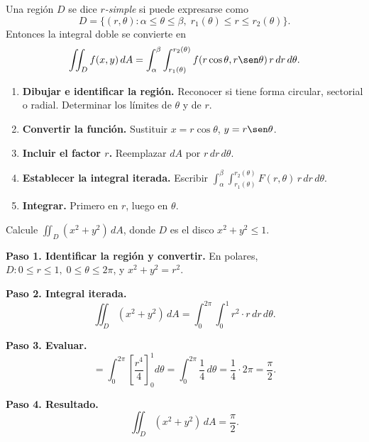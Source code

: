 Una región \(D\) se dice \emph{\(r\)-simple} si puede expresarse como
\[
D = \{(r,\theta): \alpha\le \theta\le \beta,\; r_1(\theta)\le r\le r_2(\theta)\}.
\]
Entonces la integral doble se convierte en
\[
\iint_D f(x,y)\,dA = \int_{\alpha}^{\beta}\int_{r_1(\theta)}^{r_2(\theta)} f(r\cos\theta,r\sen\theta)\,r\,dr\,d\theta.
\]

\begin{pasos}
\begin{enumerate}
    \item \textbf{Dibujar e identificar la región.} Reconocer si tiene forma circular, sectorial o radial. Determinar los límites de \(\theta\) y de \(r\).
    \item \textbf{Convertir la función.} Sustituir \(x=r\cos\theta\), \(y=r\sen\theta\).
    \item \textbf{Incluir el factor \(r\).} Reemplazar \(dA\) por \(r\,dr\,d\theta\).
    \item \textbf{Establecer la integral iterada.} Escribir \(\int_\alpha^\beta \int_{r_1(\theta)}^{r_2(\theta)} F(r,\theta)\,r\,dr\,d\theta\).
    \item \textbf{Integrar.} Primero en \(r\), luego en \(\theta\).
\end{enumerate}
\end{pasos}

\begin{example}
Calcule \(\displaystyle \iint_D (x^2+y^2)\,dA\), donde \(D\) es el disco \(x^2+y^2\le 1\).
\begin{myproof}
\textbf{Paso 1. Identificar la región y convertir.} En polares, \(D: 0\le r\le 1,\; 0\le\theta\le 2\pi\), y \(x^2+y^2=r^2\).

\textbf{Paso 2. Integral iterada.}
\[
\iint_D (x^2+y^2)\,dA = \int_0^{2\pi}\int_0^1 r^2\cdot r\,dr\,d\theta.
\]

\textbf{Paso 3. Evaluar.}
\[
= \int_0^{2\pi}\left[\frac{r^4}{4}\right]_0^1 d\theta
= \int_0^{2\pi}\frac{1}{4}\,d\theta
= \frac{1}{4}\cdot 2\pi = \frac{\pi}{2}.
\]

\textbf{Paso 4. Resultado.}
\[
\boxed{\iint_D (x^2+y^2)\,dA = \frac{\pi}{2}.}
\]
\end{myproof}
\end{example}


